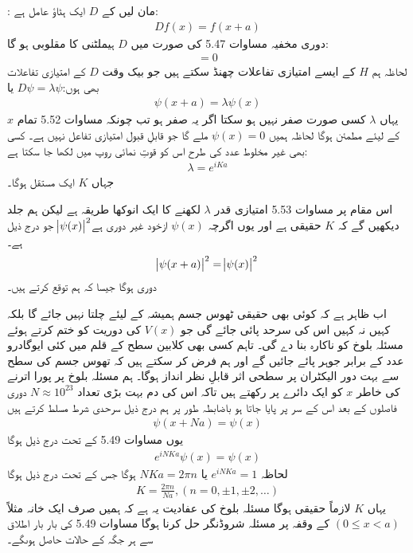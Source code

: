 : مان لیں کے $D$ ایک ہٹاؤ عامل ہے:
\begin{align}
	Df(x) = f(x+a)
\end{align}
دوری مخفیہ مساوات \num{5.47} کی صورت میں $D$ ہیملٹنی کا  مقلوبی  ہو گا:
\begin{align}
	[D, H] = 0
\end{align}
لحاظہ ہم $H$ کے ایسے امتیازی تفاعلات چھنڈ سکتے ہیں جو بیک وقت $D$ کے امتیازی تفاعلات بھی ہوں:\(D\psi = \lambda\psi\) یا
\begin{align}
	\psi(x+a) = \lambda\psi(x)
\end{align}
یہاں $\lambda$ کسی صورت صفر نہیں ہو سکتا اگر یہ صفر ہو تب چونکہ مساوات \num{5.52} تمام $x$ کے لیئے مطمئن ہوگا لحاظہ ہمیں \(\psi(x) = 0\) ملے گا جو قابلِ قبول امتیازی تفاعل نہیں ہے۔ کسی بھی غیر مخلوط عدد کی طرح اس کو قوتِ نمائی روپ میں لکھا جا سکتا ہے: 
\begin{align}
	\lambda = e^{iKa}
\end{align}
جہاں $K$ ایک مستقل ہوگا۔

اس مقام پر مساوات \num{5.53} امتیازی قدر $\lambda$ لکھنے کا ایک انوکھا طریقہ ہے لیکن ہم جلد دیکھیں گے کہ $K$ حقیقی ہے اور یوں اگرچہ $\psi(x)$ ازخود غیر دوری ہے\(\abs{\psi(x)}^{2}\) جو درج ذیل ہے۔
\begin{align}
	\abs{\psi(x+a)}^{2} = \abs{\psi(x)}^{2}
\end{align}
دوری ہوگا جیسا کہ ہم توقع کرتے ہیں۔

اب ظاہر ہے کہ کوئی بھی حقیقی ٹھوس جسم ہمیشہ کے لیئے چلتا نہیں جائے گا بلکہ کہیں نہ کہیں اس کی سرحد پائی جائے گی جو $V(x)$ کی دوریت کو ختم کرتے ہوئے مسئلہ بلوخ کو ناکارہ بنا دے گی۔ تاہم کسی بھی کلابین سطح کے  قلم میں کئی ایوگادرو عدد کے برابر جوہر پائے جائیں گے اور ہم فرض کر سکتے ہیں کہ تھوس جسم کی سطح سے بہت دور الیکٹران پر سطحی اثر قابلِ نظر انداز ہوگا۔ ہم مسئلہ بلوخ پر پورا اترنے کی خاطر $x$ کو ایک دائرے پر رکھتے ہیں تاکہ اس کی دم بہت بڑی تعداد \(N\approx10^{23}\) دوری فاصلوں کے بعد اس کے سر پر پایا جاتا ہو باضابطہ طور پر ہم درج ذیل سرحدی شرط مسلط کرتے ہیں   
\begin{align}
	\psi(x+Na) = \psi(x)
\end{align}
یوں مساوات \num{5.49} کے تحت درج ذیل ہوگا
\begin{align*}
	e^{iNKa}\psi(x) = \psi(x)
\end{align*}
لحاظہ \(e^{iNKa} = 1\) یا \(NKa = 2\pi n\) ہوگا جس کے تحت درج ذیل ہوگا 
\begin{align}
	K = \frac{2\pi n}{Na}, (n = 0, \pm1, \pm2, \dots)
\end{align}
یہاں $K$ لازماً حقیقی ہوگا مسئلہ بلوخ کی عفادیت یہ ہے کہ ہمیں صرف ایک خانہ مثلاً \((0\leq x<a)\) کے وقفہ پر مسئلہ شروڈنگر حل کرنا ہوگا مساوات \num{5.49} کی بار بار اطلاق سے ہر جگہ کے حالات  حاصل ہوںگے۔

